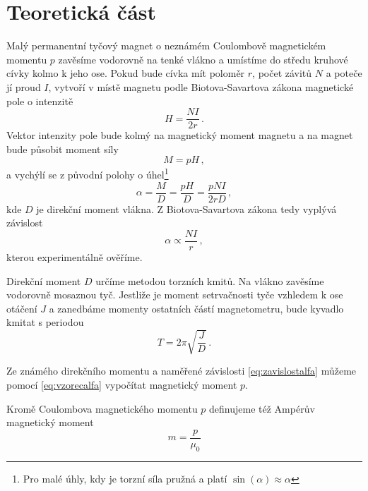 \section*{Teoretická část}

Malý permanentní tyčový magnet o neznámém Coulombově magnetickém momentu $p$ zavěsíme vodorovně na tenké vlákno a umístíme do středu kruhové cívky kolmo k jeho ose.
Pokud bude cívka mít poloměr $r$, počet závitů $N$ a poteče jí proud $I$, vytvoří v místě magnetu podle Biotova-Savartova zákona magnetické pole o intenzitě
\begin{equation}
H=\frac{NI}{2r} \,.
\end{equation}
Vektor intenzity pole bude kolmý na magnetický moment magnetu a na magnet bude působit moment síly
\begin{equation}
M=pH \,,
\end{equation}
a vychýlí se z původní polohy o úhel\footnote{Pro malé úhly, kdy je torzní síla pružná a platí $\sin(\alpha)\approx\alpha$}
\begin{equation} \label{eq:vzorecalfa}
\alpha = \frac{M}{D} = \frac{pH}{D} = \frac{pNI}{2rD} \,,
\end{equation}
kde $D$ je direkční moment vlákna.
Z Biotova-Savartova zákona tedy vyplývá závislost
\begin{equation} \label{eq:zavislostalfa}
\alpha \propto \frac{NI}{r} \,,
\end{equation}
kterou experimentálně ověříme.

Direkční moment $D$ určíme metodou torzních kmitů.
Na vlákno zavěsíme vodorovně mosaznou tyč.
Jestliže je moment setrvačnosti tyče vzhledem k ose otáčení $J$ a zanedbáme momenty ostatních částí magnetometru, bude kyvadlo kmitat s periodou 
\begin{equation}
T=2\pi \sqrt{\frac{J}{D}} \,.
\end{equation}

Ze známého direkčního momentu a naměřené závislosti \eqref{eq:zavislostalfa} můžeme pomocí \eqref{eq:vzorecalfa} vypočítat magnetický moment $p$.

Kromě Coulombova magnetického momentu $p$ definujeme též Ampérův magnetický moment
\begin{equation}
m=\frac{p}{\mu_0}
\end{equation}